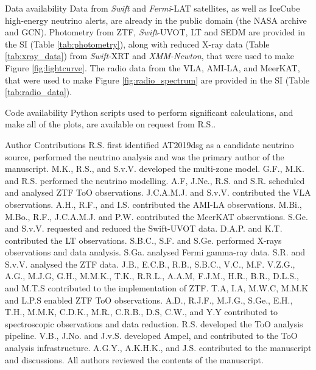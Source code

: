 \documentclass{nature_plusfigure}
\begin{document}
\begin{addendum}

\item[Data availability] Data from \textit{Swift} and \textit{Fermi}-LAT satellites, as well as IceCube high-energy neutrino alerts, are already in the public domain (the NASA archive and GCN). Photometry from ZTF, \textit{Swift}-UVOT, LT and SEDM are provided in the SI (Table \ref{tab:photometry}), along with reduced X-ray data (Table \ref{tab:xray_data}) from \textit{Swift}-XRT and \textit{XMM-Newton}, that were used to make Figure \ref{fig:lightcurve}. The radio data from the VLA, AMI-LA, and MeerKAT, that were used to make Figure \ref{fig:radio_spectrum} are provided in the SI (Table \ref{tab:radio_data}). 

\item[Code availability] Python scripts used to perform significant calculations, and make all of the plots, are available on request from R.S..

\item[Author Contributions] R.S. first identified AT2019dsg as a candidate neutrino source, performed the neutrino analysis and was the primary author of the manuscript. M.K., R.S., and S.v.V. developed the multi-zone model. G.F., M.K. and R.S. performed the neutrino modelling. A.F, J.Ne., R.S. and S.R. scheduled and analysed ZTF ToO observations. J.C.A.M.J. and S.v.V. contributed the VLA observations. A.H., R.F., and I.S. contributed the AMI-LA observations. M.Bi., M.Bo., R.F., J.C.A.M.J. and P.W. contributed the MeerKAT observations. S.Ge. and S.v.V. requested and reduced the Swift-UVOT data. D.A.P. and K.T. contributed the LT observations. S.B.C., S.F. and S.Ge. performed X-rays observations and data analysis. S.Ga. analysed Fermi gamma-ray data. S.R. and S.v.V. analysed the ZTF data. J.B., E.C.B., R.B., S.B.C., V.C., M.F. V.Z.G., A.G., M.J.G, G.H., M.M.K., T.K., R.R.L., A.A.M, F.J.M., H.R., B.R., D.L.S., and M.T.S contributed to the implementation of ZTF. T.A, I.A, M.W.C, M.M.K and L.P.S enabled ZTF ToO observations. A.D., R.J.F., M.J.G., S.Ge., E.H., T.H., M.M.K, C.D.K., M.R., C.R.B., D.S, C.W., and Y.Y contributed to spectroscopic observations and data reduction. R.S. developed the ToO analysis pipeline. V.B., J.No. and J.v.S. developed Ampel, and contributed to the ToO analysis infrastructure. A.G.Y., A.K.H.K., and J.S. contributed to the manuscript and discussions. All authors reviewed the contents of the manuscript.


\end{addendum}
\end{document}
